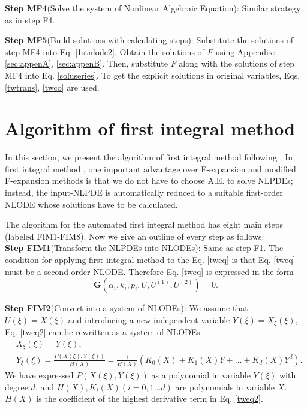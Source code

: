 \documentclass[prd,aps,floats,showkeys,nofootinbib,notitlepage]{revtex4-2}
\begin{document}
	\textbf{Step MF4}(Solve the system of Nonlinear Algebraic Equation): Similar strategy as in step F4.
	
	\textbf{Step MF5}(Build solutions with calculating steps): Substitute the solutions of step MF4 into Eq. \eqref{1stnlode2}. Obtain the solutions of $F$ using Appendix: \ref{sec:appenA}, \ref{sec:appenB}. Then, substitute $F$ along with the solutions of step MF4 into Eq. \eqref{soluseries}. To get the explicit solutions in original variables, Eqs. \eqref{twtrans}, \eqref{twco} are used.
	
	
	\section{Algorithm of first integral method}\label{sec:fim}
	In this section, we present the algorithm of first integral method following \cite{fim0,fim,mirza,complexTwt1}.
	In first integral method \cite{fim0,fim,mirza,complexTwt1}, one important advantage over F-expansion and modified F-expansion methods is that we do not have to choose A.E. to solve NLPDEs; instead, the input-NLPDE is automatically reduced to a suitable first-order NLODE whose solutions have to be calculated.  
	
	The algorithm for the automated first integral method has eight main steps (labeled FIM1-FIM8). Now we give an outline of every step as follows:\\
	
	\textbf{Step FIM1}(Transform the NLPDEs into NLODEs): Same as step F1. The condition for applying first integral method to the Eq. \eqref{tweq} is that Eq. \eqref{tweq} must be a second-order NLODE. Therefore Eq. \eqref{tweq} is expressed in the form
	\begin{equation}\label{tweq2}
		\mathbf{G} \left( {\alpha_i,k_i,p_i,U,U^{(1)},U^{(2)}} \right) = 0.
	\end{equation}
	
	\textbf{Step FIM2}(Convert into a system of NLODEs): We assume that $U(\xi)=X(\xi)$ and introducing a new independent variable $Y(\xi) = X_{\xi}(\xi)$, Eq. \eqref{tweq2} can be rewritten as a system of NLODEs \cite{fim0}
	\begin{subequations}\label{sysode}
		\begin{align}
			&X_{\xi}(\xi)= Y(\xi),\label{sysode1}\\
			&Y_{\xi}(\xi)= \frac{P(X(\xi),Y(\xi))}{H(X)} = \frac{1}{H(X)}\left(K_0(X)+K_1(X)Y+\ldots+K_d(X)Y^d\right)\label{sysode2}.
		\end{align}
	\end{subequations}
	We have expressed $P(X(\xi),Y(\xi))$ as a polynomial in variable $Y(\xi)$ with degree $d$, and $H(X),K_i(X)(i=0,1\ldots d)$ are polynomials in variable $X$.
	$H(X)$ is the coefficient of the highest derivative term in Eq. \eqref{tweq2}.\\
	
\end{document}
